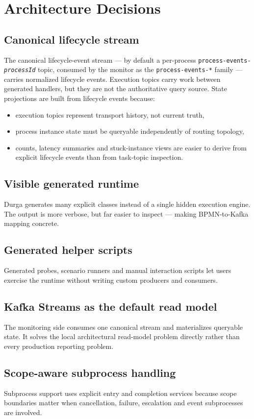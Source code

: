 \section{Architecture Decisions}
\label{sec:ArchitectureDecisions}

\subsection{Canonical lifecycle stream}

The canonical lifecycle-event stream --- by default a per-process
\texttt{process-events-\textit{processId}} topic, consumed by the monitor as the
\texttt{process-events-*} family --- carries normalized lifecycle events. Execution topics
carry work between generated handlers, but they are not the authoritative query source.
State projections are built from lifecycle events because:
\begin{itemize}
\item execution topics represent transport history, not current truth,
\item process instance state must be queryable independently of routing topology,
\item counts, latency summaries and stuck-instance views are easier to derive from explicit
lifecycle events than from task-topic inspection.
\end{itemize}

\subsection{Visible generated runtime}

Durga generates many explicit classes instead of a single hidden execution engine. The output
is more verbose, but far easier to inspect — making BPMN-to-Kafka mapping concrete.

\subsection{Generated helper scripts}

Generated probes, scenario runners and manual interaction scripts let users exercise the
runtime without writing custom producers and consumers.

\subsection{Kafka Streams as the default read model}

The monitoring side consumes one canonical stream and materializes queryable state. It solves
the local architectural read-model problem directly rather than every production reporting
problem.

\subsection{Scope-aware subprocess handling}

Subprocess support uses explicit entry and completion services because scope boundaries
matter when cancellation, failure, escalation and event subprocesses are involved.
